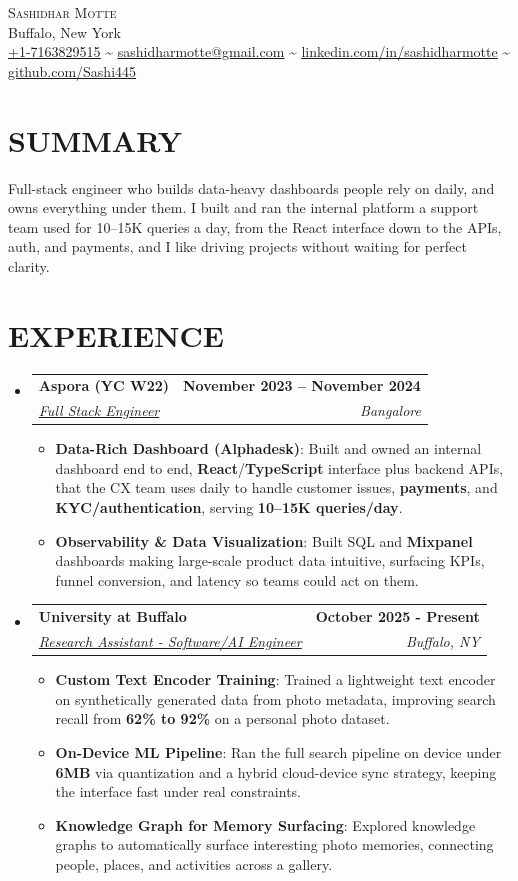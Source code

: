 \documentclass[letterpaper,11pt]{article}
\makeatletter
\newcommand{\resumeItem}[1]{\item\small{{#1 \vspace{-3pt}}}}
\newcommand{\resumeSubheading}[4]{\vspace{-2pt}\item\begin{tabular*}{1.0\textwidth}[t]{l@{\extracolsep{\fill}}r}\textbf{\large#1} & \textbf{\small #2} \\ \textit{\large#3} & \textit{\small #4} \\ \end{tabular*}\vspace{-7pt}}
\newcommand{\resumeSubHeadingListStart}{\begin{itemize}[leftmargin=0.0in, label={}]}
\newcommand{\resumeSubHeadingListEnd}{\end{itemize}}
\newcommand{\resumeItemListStart}{\begin{itemize}}
\newcommand{\resumeItemListEnd}{\end{itemize}\vspace{-6pt}}
\makeatother
\begin{document}
\begin{center}
    {\Huge \scshape Sashidhar Motte} \\ \vspace{1pt}
    Buffalo, New York \\ \vspace{1pt}
    \small 
    \href{tel:+17163829515}{\underline{+1-7163829515}} \textasciitilde{} 
    \href{mailto:sashidharmotte@gmail.com}{\underline{sashidharmotte@gmail.com}} \textasciitilde{}  
    \href{https://www.linkedin.com/in/sashidharmotte/}{\underline{linkedin.com/in/sashidharmotte}} \textasciitilde{} 
    \href{https://github.com/Sashi445}{\underline{github.com/Sashi445}}
    \vspace{-8pt}
\end{center}
\section{SUMMARY}
\small{Full-stack engineer who builds data-heavy dashboards people rely on daily, and owns everything under them. I built and ran the internal platform a support team used for 10--15K queries a day, from the React interface down to the APIs, auth, and payments, and I like driving projects without waiting for perfect clarity.}
\vspace{-6pt}
\section{EXPERIENCE}
  \resumeSubHeadingListStart
    \resumeSubheading
      {Aspora (YC W22)}{November 2023 -- November 2024} 
      {\underline{Full Stack Engineer}}{Bangalore}
      \resumeItemListStart
        \resumeItem{\textbf{Data-Rich Dashboard (Alphadesk)}: Built and owned an internal dashboard end to end, \textbf{React}/\textbf{TypeScript} interface plus backend APIs, that the CX team uses daily to handle customer issues, \textbf{payments}, and \textbf{KYC/authentication}, serving \textbf{10--15K queries/day}.}
        \resumeItem{\textbf{Observability \& Data Visualization}: Built SQL and \textbf{Mixpanel} dashboards making large-scale product data intuitive, surfacing KPIs, funnel conversion, and latency so teams could act on them.}
      \resumeItemListEnd
    \resumeSubheading
      {University at Buffalo}{October 2025 - Present}
      {\underline{Research Assistant - Software/AI Engineer}}{Buffalo, NY}
      \resumeItemListStart
        \resumeItem{\textbf{Custom Text Encoder Training}: Trained a lightweight text encoder on synthetically generated data from photo metadata, improving search recall from \textbf{62\% to 92\%} on a personal photo dataset.}
        \resumeItem{\textbf{On-Device ML Pipeline}: Ran the full search pipeline on device under \textbf{6MB} via quantization and a hybrid cloud-device sync strategy, keeping the interface fast under real constraints.}
        \resumeItem{\textbf{Knowledge Graph for Memory Surfacing}: Explored knowledge graphs to automatically surface interesting photo memories, connecting people, places, and activities across a gallery.}
      \resumeItemListEnd
  \resumeSubHeadingListEnd
\end{document}
